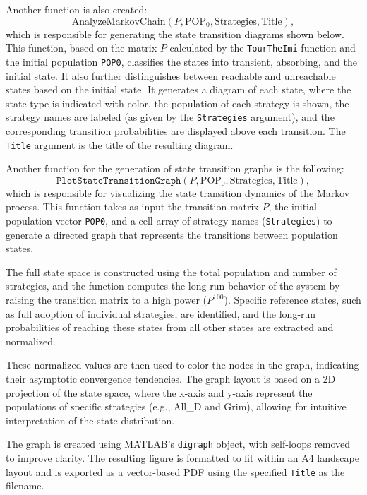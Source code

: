 Another function is also created:
\[
\text{AnalyzeMarkovChain}(P, \text{POP}_0, \text{Strategies}, \text{Title}),
\]
which is responsible for generating the state transition diagrams shown below. This function, based on the matrix \( P \) calculated by the \texttt{TourTheImi} function and the initial population \texttt{POP0}, classifies the states into transient, absorbing, and the initial state. It also further distinguishes between reachable and unreachable states based on the initial state. It generates a diagram of each state, where the state type is indicated with color, the population of each strategy is shown, the strategy names are labeled (as given by the \texttt{Strategies} argument), and the corresponding transition probabilities are displayed above each transition. The \texttt{Title} argument is the title of the resulting diagram.

Another function for the generation of state transition graphs is the following:
\[
\texttt{PlotStateTransitionGraph}(P, \text{POP}_0, \text{Strategies}, \text{Title}),
\]
which is responsible for visualizing the state transition dynamics of the Markov process. This function takes as input the transition matrix \( P \), the initial population vector \texttt{POP0}, and a cell array of strategy names (\texttt{Strategies}) to generate a directed graph that represents the transitions between population states.

The full state space is constructed using the total population and number of strategies, and the function computes the long-run behavior of the system by raising the transition matrix to a high power (\( P^{100} \)). Specific reference states, such as full adoption of individual strategies, are identified, and the long-run probabilities of reaching these states from all other states are extracted and normalized.

These normalized values are then used to color the nodes in the graph, indicating their asymptotic convergence tendencies. The graph layout is based on a 2D projection of the state space, where the x-axis and y-axis represent the populations of specific strategies (e.g., All\_D and Grim), allowing for intuitive interpretation of the state distribution.

The graph is created using MATLAB's \texttt{digraph} object, with self-loops removed to improve clarity. The resulting figure is formatted to fit within an A4 landscape layout and is exported as a vector-based PDF using the specified \texttt{Title} as the filename.

